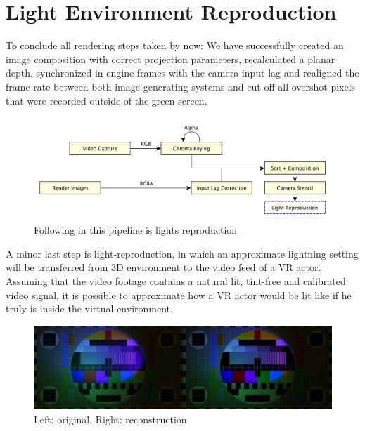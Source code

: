 %
\section{Light Environment Reproduction}

To conclude all rendering steps taken by now: We have successfully created an 
image composition with correct projection parameters, recalculated a planar 
depth, synchronized in-engine frames with the camera input lag and realigned 
the frame rate between both image generating systems and cut off all overshot 
pixels that were recorded outside of the green screen.

\begin{figure}[htb]
	\includegraphics[width=\textwidth]{_raw_resources/pipeline_steps/4_7_lights.pdf}
	\caption{Following in this pipeline is lights reproduction}
	\label{fig:steps:lights}
\end{figure}

A minor last step is light-reproduction, in which an approximate lightning 
setting will be transferred from 3D environment to the video feed of a VR 
actor. Assuming that the video footage contains a natural lit, tint-free and 
calibrated video signal, it is possible to approximate how a VR actor would 
be lit like if he truly is inside the virtual environment.

\begin{figure}[htb]
	\includegraphics[width=\textwidth]{_raw_resources/light-reconstruction/comparison.jpg}
	\caption{Left: original, Right: reconstruction}
	\label{fig:light-reconstruction:comparison}
\end{figure}

